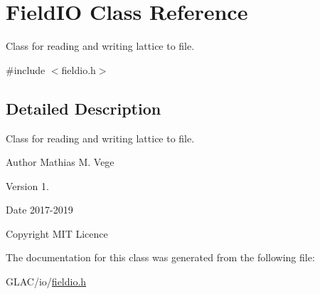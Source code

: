 \hypertarget{class_field_i_o}{}\section{Field\+IO Class Reference}
\label{class_field_i_o}


Class for reading and writing lattice to file.  




{\ttfamily \#include $<$fieldio.\+h$>$}



\subsection{Detailed Description}
Class for reading and writing lattice to file. 

\begin{DoxyAuthor}{Author}
Mathias M. Vege 
\end{DoxyAuthor}
\begin{DoxyVersion}{Version}
1. 
\end{DoxyVersion}
\begin{DoxyDate}{Date}
2017-\/2019 
\end{DoxyDate}
\begin{DoxyCopyright}{Copyright}
M\+IT Licence 
\end{DoxyCopyright}


The documentation for this class was generated from the following file\+:\begin{DoxyCompactItemize}
\item 
G\+L\+A\+C/io/\mbox{\hyperlink{fieldio_8h}{fieldio.\+h}}\end{DoxyCompactItemize}
